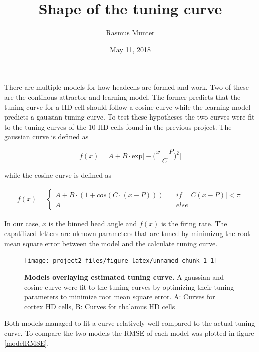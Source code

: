 \documentclass[]{article}
\title{Shape of the tuning curve}
\author{Rasmus Munter}
\date{May 11, 2018}
\begin{document}
\maketitle

\captionsetup{width=5in}

There are multiple models for how headcells are formed and work. Two of
these are the continous attractor and learning model. The former
predicts that the tuning curve for a HD cell should follow a cosine
curve while the learning model predicts a gaussian tuning curve. To test
these hypotheses the two curves were fit to the tuning curves of the 10
HD cells found in the previous project. The gaussian curve is defined as

\[
f(x) = A + B\cdot\text{exp}\bigg[-\Bigg(\frac{x-P}{C}\bigg)^2\Bigg]
\]

while the cosine curve is defined as

\begin{align*}
    f(x) = 
    \begin{cases}
        A + B \cdot (1 + cos(C\cdot(x-P))) \quad &if\quad |C(x-P)|<\pi \\
        A \quad &else
    \end{cases}
\end{align*}

In our case, \(x\) is the binned head angle and \(f(x)\) is the firing
rate. The capatilized letters are uknown parameters that are tuned by
minimizng the root mean square error between the model and the calculate
tuning curve.

\begin{figure}[H]

{\centering \texttt{[image: project2\_files/figure-latex/unnamed-chunk-1-1]} 

}

\caption{\label{models}\textbf{Models overlaying estimated tuning curve.} A gaussian and cosine curve were fit to the tuning curves by optimizing their tuning parameters to minimize root mean square error. A: Curves for cortex HD cells, B: Curves for thalamus HD cells}\label{fig:unnamed-chunk-1}
\end{figure}

Both models managed to fit a curve relatively well compared to the
actual tuning curve. To compare the two models the RMSE of each model
was plotted in figure \ref{modelRMSE}.
\end{document}
